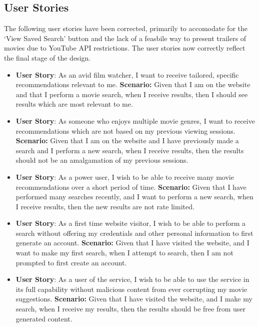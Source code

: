 \documentclass{article}
\begin{document}
\subsection{User Stories}
The following user stories have been corrected, primarily to accomodate for the
`View Saved Search' button and the lack of a feasbile way to present
trailers of movies due to YouTube API restrictions. The user stories now
correctly reflect the final stage of the design.
\begin{itemize}
\item \textbf{User Story}: As an avid film watcher, I want to receive
tailored, specific recommendations relevant to me.
\newline \textbf {Scenario:} Given that I am on the website and that I perform
a movie search, when I receive results, then I should see results which are
most relevant to me.

\item \textbf{User Story}: As someone who enjoys multiple movie genres, I want
to receive recommendations which are not based on my previous viewing sessions.
\newline \textbf {Scenario:} Given that I am on the website and I have
previously made a search and I perform a new search, when I receive results,
then the results should not be an amalgamation of my previous sessions.

\item \textbf{User Story}: As a power user, I wish to be able to receive many
movie recommendations over a short period of time.
\newline \textbf {Scenario:} Given that I have performed many searches recently,
and I want to perform a new search, when I receive results, then the new
results are not rate limited.

\item \textbf{User Story}: As a first time website visitor, I wish to be able
to perform a search without offering my credentials and other personal
information to first generate an account.
\newline \textbf {Scenario:} Given that I have visited the website, and I want
to make my first search, when I attempt to search, then I am not prompted
to first create an account.

\item \textbf{User Story}: As a user of the service, I wish to be able to use
the service in its full capability without malicious content from ever
corrupting my movie suggestions.
\newline \textbf {Scenario:}  Given that I have visited the website, and I make
my search, when I receive my results, then the results should be free from user
generated content.


\end{itemize}
\end{document}
